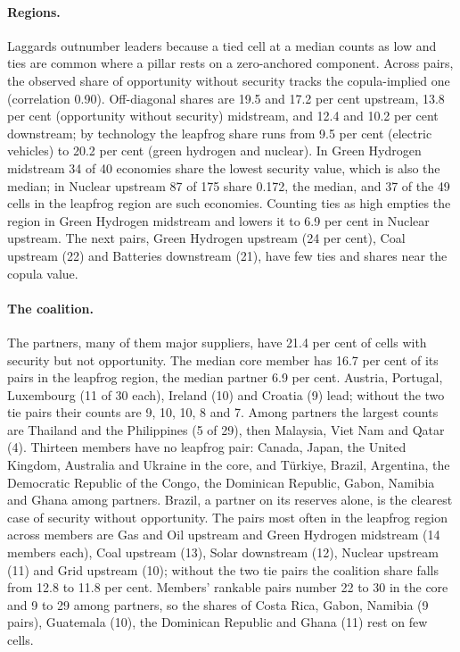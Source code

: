 \paragraph{Regions.} Laggards outnumber leaders because a tied cell at a median counts as low and
ties are common where a pillar rests on a zero-anchored component. Across pairs, the observed share
of opportunity without security tracks the copula-implied one (correlation 0.90). Off-diagonal
shares are 19.5 and 17.2 per cent upstream, 13.8 per cent (opportunity without security)
midstream, and 12.4 and 10.2 per cent downstream; by technology the leapfrog share runs from 9.5
per cent (electric vehicles) to 20.2 per cent (green hydrogen and nuclear). In Green Hydrogen
midstream 34 of 40 economies share the lowest security value, which is also the median; in Nuclear
upstream 87 of 175 share 0.172, the median, and 37 of the 49 cells in the leapfrog region are such
economies. Counting ties as high empties the region in Green Hydrogen midstream and lowers it to
6.9 per cent in Nuclear upstream. The next pairs, Green Hydrogen upstream (24 per cent), Coal
upstream (22) and Batteries downstream (21), have few ties and shares near the copula value.

\paragraph{The coalition.} The partners, many of them major suppliers, have 21.4 per cent of cells
with security but not opportunity. The median core member has 16.7 per cent of its pairs in the
leapfrog region, the median partner 6.9 per cent. Austria, Portugal, Luxembourg (11 of 30 each),
Ireland (10) and Croatia (9) lead; without the two tie pairs their counts are 9, 10, 10, 8 and 7.
Among partners the largest counts are Thailand and the Philippines (5 of 29), then Malaysia, Viet
Nam and Qatar (4). Thirteen members have no leapfrog pair: Canada, Japan, the United Kingdom,
Australia and Ukraine in the core, and T\"urkiye, Brazil, Argentina, the Democratic Republic of the
Congo, the Dominican Republic, Gabon, Namibia and Ghana among partners. Brazil, a partner on its
reserves alone, is the clearest case of security without opportunity. The pairs most often in the
leapfrog region across members are Gas and Oil upstream and Green Hydrogen midstream (14 members
each), Coal upstream (13), Solar downstream (12), Nuclear upstream (11) and Grid upstream (10);
without the two tie pairs the coalition share falls from 12.8 to 11.8 per cent. Members' rankable
pairs number 22 to 30 in the core and 9 to 29 among partners, so the shares of Costa Rica, Gabon,
Namibia (9 pairs), Guatemala (10), the Dominican Republic and Ghana (11) rest on few cells.

